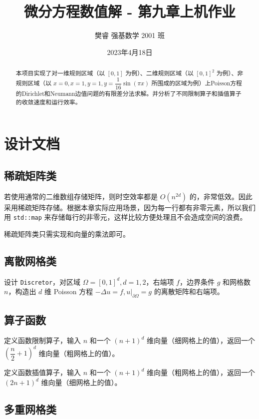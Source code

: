 \documentclass{ctexart}
\title{微分方程数值解 - 第九章上机作业}
\author{樊睿 强基数学 2001 班}
\date{2023年4月18日}
\begin{document}
\maketitle

\begin{abstract}
    本项目实现了对一维规则区域（以 $[0,1]$ 为例）、二维规则区域（以 $[0,1]^2$ 为例）、非规则区域（以 $x=0,x=1,y=1,y=\dfrac 1{16}\sin(\pi x)$ 所围成的区域为例）上Poisson方程的Dirichlet和Neumann边值问题的有限差分法求解。并分析了不同限制算子和插值算子的收敛速度和运行效率。
\end{abstract}

\section{设计文档}

\subsection{稀疏矩阵类}

若使用通常的二维数组存储矩阵，则时空效率都是 $O(n^{2d})$ 的，非常低效。因此采用稀疏矩阵存储。根据本章实际应用场景，因为每一行都有非零元素，所以我们用 \verb|std::map| 来存储每行的非零元，这样比较方便处理且不会造成空间的浪费。

稀疏矩阵类只需实现和向量的乘法即可。

\subsection{离散网格类}

设计 \verb|Discretor|，对区域 $\Omega = [0,1]^d,d=1,2$，右端项 $f$，边界条件 $g$ 和网格数 $n$，构造出 $d$ 维 Poisson 方程 $-\Delta u = f,u|_{\partial\Omega} = g$ 的离散矩阵和右端项。

\subsection{算子函数}

定义函数限制算子，输入 $n$ 和一个 $(n+1)^d$ 维向量（细网格上的值），返回一个 $(\dfrac n2+1)^d$ 维向量（粗网格上的值）。

定义函数插值算子，输入 $n$ 和一个 $(n+1)^d$ 维向量（粗网格上的值），返回一个 $(2n+1)^d$ 维向量（细网格上的值）。

\subsection{多重网格类}
\end{document}
